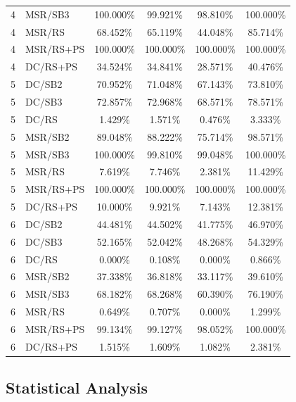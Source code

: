 \documentclass[10pt,a4paper]{article}
\begin{document}
\begin{longtable}{c l c c c c}
4 & MSR/SB3 & 100.000\% & 99.921\% & 98.810\% & 100.000\% \\
4 & MSR/RS & 68.452\% & 65.119\% & 44.048\% & 85.714\% \\
4 & MSR/RS+PS & 100.000\% & 100.000\% & 100.000\% & 100.000\% \\
4 & DC/RS+PS & 34.524\% & 34.841\% & 28.571\% & 40.476\% \\
\midrule
5 & DC/SB2 & 70.952\% & 71.048\% & 67.143\% & 73.810\% \\
5 & DC/SB3 & 72.857\% & 72.968\% & 68.571\% & 78.571\% \\
5 & DC/RS & 1.429\% & 1.571\% & 0.476\% & 3.333\% \\
5 & MSR/SB2 & 89.048\% & 88.222\% & 75.714\% & 98.571\% \\
5 & MSR/SB3 & 100.000\% & 99.810\% & 99.048\% & 100.000\% \\
5 & MSR/RS & 7.619\% & 7.746\% & 2.381\% & 11.429\% \\
5 & MSR/RS+PS & 100.000\% & 100.000\% & 100.000\% & 100.000\% \\
5 & DC/RS+PS & 10.000\% & 9.921\% & 7.143\% & 12.381\% \\
\midrule
6 & DC/SB2 & 44.481\% & 44.502\% & 41.775\% & 46.970\% \\
6 & DC/SB3 & 52.165\% & 52.042\% & 48.268\% & 54.329\% \\
6 & DC/RS & 0.000\% & 0.108\% & 0.000\% & 0.866\% \\
6 & MSR/SB2 & 37.338\% & 36.818\% & 33.117\% & 39.610\% \\
6 & MSR/SB3 & 68.182\% & 68.268\% & 60.390\% & 76.190\% \\
6 & MSR/RS & 0.649\% & 0.707\% & 0.000\% & 1.299\% \\
6 & MSR/RS+PS & 99.134\% & 99.127\% & 98.052\% & 100.000\% \\
6 & DC/RS+PS & 1.515\% & 1.609\% & 1.082\% & 2.381\% \\
\end{longtable}

\subsection{Statistical Analysis}
\end{document}
